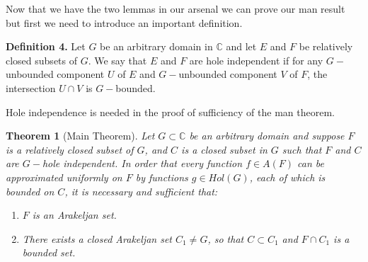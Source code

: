 \documentclass[12pt]{article}
\newtheorem{thm}{Theorem}
\begin{document}
\indent \indent Now that we have the two lemmas in our arsenal we can prove our man result but first we need to introduce an important definition.

\noindent\textbf{Definition 4.} Let \(G\) be an arbitrary domain in \(\mathbb{C}\) and let \(E\) and \(F\) be relatively closed subsets of \(G\). We say that \(E\) and \(F\) are hole independent if for any \(G-\)unbounded component \(U\) of \(E\) and \(G-\)unbounded component \(V\) of \(F\), the intersection \(U\cap V\) is \(G-\)bounded.

Hole independence is needed in the proof of sufficiency of the man theorem.

\begin{thm}[Main Theorem]
Let $G\subset \mathbb{C}$ be an arbitrary domain and suppose $F$ is a relatively closed subset of $G$, and $C$ is a closed subset in $G$ such that \(F\) and \(C\) are \(G-\)hole independent. In order that every function $f\in A(F)$ can be approximated uniformly on $F$ by functions $g\in Hol(G)$, each of which is bounded on $C$, it is necessary and sufficient that: \begin{enumerate}
\item $F$ is an Arakeljan set.
\item There exists a closed Arakeljan set $C_1\not=G$, so that $C\subset C_1$ and $F\cap C_1$ is a bounded set.
\end{enumerate}
\end{thm}
\end{document}
